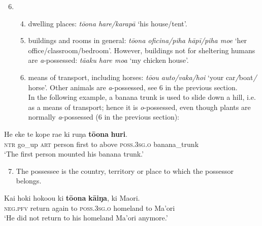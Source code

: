\begin{enumerate}
\setcounter{enumi}{5}
\item[]
\begin{enumerate}
\setcounter{enumii}{3}
\item 
dwelling places: \textit{tō{\ꞌ}ona hare/karapā} ‘his house/tent’.

\item 
buildings and rooms in general: \textit{tō{\ꞌ}ona oficina/piha hāpī/piha moe} ‘her office/classroom/bedroom’. However, buildings not for sheltering humans are \textit{a}{}-possessed: \textit{tā{\ꞌ}aku hare moa} ‘my chicken house’.

\item 
means of transport, including horses: \textit{tō{\ꞌ}ou {\ꞌ}auto/vaka/hoi} ‘your car\textit{/}boat\textit{/} horse’. Other animals are \textit{a}{}-possessed, see 6 in the previous section.\\
In the following example, a banana trunk is used to slide down a hill, i.e. as a means of transport; hence it is \textit{o}{}-possessed, even though plants are normally \textit{a}{}-possessed (6 in the previous section):

\end{enumerate}
\end{enumerate}

\ea\label{ex:6.88}
\gll He eke te kope ra{\ꞌ}e ki ruŋa \textbf{tō{\ꞌ}ona} \textbf{huri}. \\
\textsc{ntr} go\_up \textsc{art} person first to above \textsc{poss.3sg.o} banana\_trunk \\

\glt
‘The first person mounted his banana trunk.’ \textstyleExampleref{[R313.028]} 
\z

\begin{enumerate}
\setcounter{enumi}{6}
\item 
The possessee is the country, territory or place to which the possessor belongs.

\end{enumerate}

\ea\label{ex:6.89}
\gll Kai hoki hoko{\ꞌ}ou ki \textbf{tō{\ꞌ}ona} \textbf{kāiŋa}, ki Ma{\ꞌ}ori. \\
\textsc{neg.pfv} return again to \textsc{poss.3sg.o} homeland to Ma’ori \\

\glt 
‘He did not return to his homeland Ma’ori anymore.’ \textstyleExampleref{[MsE-005.004]}
\z

